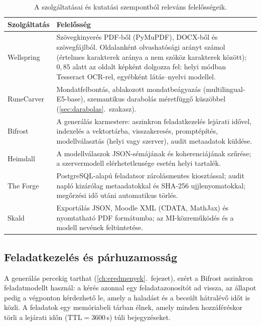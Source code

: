 \begin{table}[htbp]
\centering
\caption{A \Mimir{} szolgáltatásai és kutatási szempontból releváns felelősségeik.}
\label{tab:szolgaltatasok}
\small
\begin{tabularx}{\textwidth}{@{}>{\raggedright\arraybackslash}p{2.4cm}>{\raggedright\arraybackslash}X@{}}
\toprule
Szolgáltatás & Felelősség \\
\midrule
Wellspring & Szövegkinyerés PDF-ből (PyMuPDF), DOCX-ből és szövegfájlból. Oldalanként olvashatósági arányt
számol (értelmes karakterek aránya a nem szóköz karakterek között); $0{,}85$ alatt az oldalt képként
dolgozza fel: helyi módban Tesseract OCR-rel, egyébként látás--nyelvi modellel. \\
RuneCarver & Mondatfelbontás, ablakozott mondatbeágyazás (multilingual-E5-base), szemantikus
darabolás méretfüggő küszöbbel (\ref{sec:darabolas}.~szakasz). \\
Bifrost & A generálás karmestere: aszinkron feladatkezelés lejárati idővel, indexelés a vektortárba,
visszakeresés, promptépítés, modellválasztás (helyi vagy szerver), audit metaadatok küldése. \\
Heimdall & A modellválaszok JSON-sémájának és koherenciájának szűrése; a szervermodell
elérhetetlensége esetén helyi tartalék. \\
The Forge & PostgreSQL-alapú feladatsor zárolásmentes kiosztással; audit napló kizárólag
metaadatokkal és SHA-256 ujjlenyomatokkal; megőrzési idő utáni automatikus törlés. \\
Skald & Exportálás JSON, Moodle XML (CDATA, MathJax) és nyomtatható PDF formátumba; az MI-közreműködés
és a modell nevének feltüntetése. \\
\bottomrule
\end{tabularx}
\end{table}

\subsection{Feladatkezelés és párhuzamosság}

A generálás percekig tarthat (\ref{ch:eredmenyek}.~fejezet), ezért a Bifrost aszinkron feladatmodellt
használ: a  kérés azonnal egy feladatazonosítót ad vissza, az állapot
pedig a  végponton kérdezhető le, amely a haladást és a becsült
hátralévő időt is közli. A feladatok egy memóriabeli tárban élnek, amely minden hozzáféréskor törli a
lejárati időn ($\mathrm{TTL}=3600$\,s) túli bejegyzéseket.

